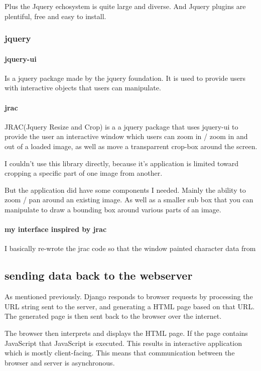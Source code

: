 Plus the Jquery echosystem is quite large and diverse.  And Jquery plugins are plentiful, free and easy to install.


\subsubsection{jquery}

\paragraph{jquery-ui}

Is a jquery package made by the jquery foundation.  It is used to provide users with interactive objects that users can manipulate.  

\paragraph{jrac}

JRAC(Jquery Resize and Crop) is a a jquery package that uses jquery-ui to provide the user an interactive window which users can zoom in / zoom in and out of a loaded image, as well as move a transparrent crop-box around the screen.

I couldn't use this library directly, because it's application is limited toward cropping a specific part of one image from another.

But the application did have some components I needed.  Mainly the ability to zoom / pan around an existing image.  As well as a smaller sub box that you can manipulate to draw a bounding box around various parts of an image.

\paragraph{my interface inspired by jrac}

I basically re-wrote the jrac code so that the window painted character data from 

\subsection{sending data back to the webserver}

As mentioned previously. Django responds to browser requests by processing the URL string sent to the server, and generating a HTML page based on that URL.  The generated page is then sent back to the browser over the internet.

The browser then interprets and displays the HTML page.  If the page contains JavaScript that JavaScript is executed.  This results in interactive application which is mostly client-facing.  This means that communication between the browser and server is asynchronous.

